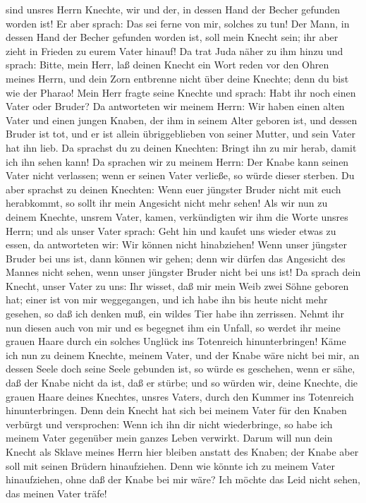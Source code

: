 sind unsres Herrn Knechte, wir und der, in dessen Hand der Becher
gefunden worden ist!  Er aber sprach: Das sei ferne von
mir, solches zu tun! Der Mann, in dessen Hand der Becher gefunden worden
ist, soll mein Knecht sein; ihr aber zieht in Frieden zu eurem Vater
hinauf!  Da trat Juda näher zu ihm hinzu und sprach:
Bitte, mein Herr, laß deinen Knecht ein Wort reden vor den Ohren meines
Herrn, und dein Zorn entbrenne nicht über deine Knechte; denn du bist
wie der Pharao!  Mein Herr fragte seine Knechte und
sprach: Habt ihr noch einen Vater oder Bruder?  Da
antworteten wir meinem Herrn: Wir haben einen alten Vater und einen
jungen Knaben, der ihm in seinem Alter geboren ist, und dessen Bruder
ist tot, und er ist allein übriggeblieben von seiner Mutter, und sein
Vater hat ihn lieb.  Da sprachst du zu deinen Knechten:
Bringt ihn zu mir herab, damit ich ihn sehen kann!  Da
sprachen wir zu meinem Herrn: Der Knabe kann seinen Vater nicht
verlassen; wenn er seinen Vater verließe, so würde dieser sterben.
 Du aber sprachst zu deinen Knechten: Wenn euer jüngster
Bruder nicht mit euch herabkommt, so sollt ihr mein Angesicht nicht mehr
sehen!  Als wir nun zu deinem Knechte, unsrem Vater,
kamen, verkündigten wir ihm die Worte unsres Herrn;  und
als unser Vater sprach: Geht hin und kaufet uns wieder etwas zu essen,
 da antworteten wir: Wir können nicht hinabziehen! Wenn
unser jüngster Bruder bei uns ist, dann können wir gehen; denn wir
dürfen das Angesicht des Mannes nicht sehen, wenn unser jüngster Bruder
nicht bei uns ist!  Da sprach dein Knecht, unser Vater zu
uns: Ihr wisset, daß mir mein Weib zwei Söhne geboren hat;
 einer ist von mir weggegangen, und ich habe ihn bis
heute nicht mehr gesehen, so daß ich denken muß, ein wildes Tier habe
ihn zerrissen.  Nehmt ihr nun diesen auch von mir und es
begegnet ihm ein Unfall, so werdet ihr meine grauen Haare durch ein
solches Unglück ins Totenreich hinunterbringen!  Käme ich
nun zu deinem Knechte, meinem Vater, und der Knabe wäre nicht bei mir,
an dessen Seele doch seine Seele gebunden ist,  so würde
es geschehen, wenn er sähe, daß der Knabe nicht da ist, daß er stürbe;
und so würden wir, deine Knechte, die grauen Haare deines Knechtes,
unsres Vaters, durch den Kummer ins Totenreich hinunterbringen.
 Denn dein Knecht hat sich bei meinem Vater für den
Knaben verbürgt und versprochen: Wenn ich ihn dir nicht wiederbringe, so
habe ich meinem Vater gegenüber mein ganzes Leben verwirkt.
 Darum will nun dein Knecht als Sklave meines Herrn hier
bleiben anstatt des Knaben; der Knabe aber soll mit seinen Brüdern
hinaufziehen.  Denn wie könnte ich zu meinem Vater
hinaufziehen, ohne daß der Knabe bei mir wäre? Ich möchte das Leid nicht
sehen, das meinen Vater träfe!

